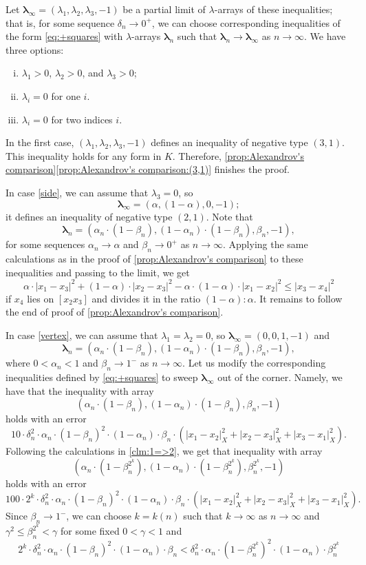 \documentclass[a4paper,10pt]{article}
\begin{document}
Let $\bm{\lambda}_\infty=(\lambda_1,\lambda_2,\lambda_3,-1)$ be a partial limit of $\lambda$-arrays of these inequalities;
that is, for some sequence $\delta_n\to 0^+$, we can choose corresponding inequalities of the form \ref{eq:+squares} with $\lambda$-arrays $\bm{\lambda}_n$ such that $\bm{\lambda}_n\to \bm{\lambda}_\infty$ as $n\to \infty$.
We have three options:
\begin{enumerate}[(i)]
\item\label{in} $\lambda_1>0$, $\lambda_2>0$, and $\lambda_3>0$;
\item\label{side} $\lambda_i=0$ for one $i$.
\item\label{vertex} $\lambda_i=0$ for two indices $i$.
\end{enumerate}

In the first case,  $(\lambda_1,\lambda_2,\lambda_3,-1)$ defines an inequality of negative type $(3,1)$.
This inequality holds for any form in $K$.
Therefore, \ref{prop:Alexandrov's comparison}\ref{prop:Alexandrov's comparison:(3,1)} finishes the proof.

In case \ref{side}, we can assume that $\lambda_3=0$, so
\[\bm{\lambda}_\infty=(\alpha,(1-\alpha),0,-1);\]
it defines an inequality of negative type $(2,1)$.
Note that
\[\bm{\lambda}_n=(\alpha_n\cdot(1-\beta_n),(1-\alpha_n)\cdot(1-\beta_n),\beta_n,-1),\]
for some sequences $\alpha_n\to\alpha$ and $\beta_n\to 0^+$ as $n\to\infty$.
Applying the same calculations as in the proof of \ref{prop:Alexandrov's comparison} to these inequalities and passing to the limit, we get
\[
\alpha\cdot|x_1-x_3|^2+(1-\alpha)\cdot|x_2-x_3|^2-\alpha\cdot (1-\alpha)\cdot|x_1-x_2|^2
\le
|x_3-x_4|^2
\]
if $x_4$ lies on $[x_2x_3]$ and divides it in the ratio $(1-\alpha):\alpha$.
It remains to follow the end of proof of \ref{prop:Alexandrov's comparison}.

In case \ref{vertex}, we can assume that $\lambda_1=\lambda_2=0$, so $\bm{\lambda}_\infty=(0,0,1,-1)$ and
\[\bm{\lambda}_n=(\alpha_n\cdot(1-\beta_n),(1-\alpha_n)\cdot(1-\beta_n),\beta_n,-1),\]
where $0<\alpha_n<1$ and $\beta_n\to 1^-$ as $n\to\infty$.
Let us modify the corresponding inequalities defined by \ref{eq:+squares} to sweep $\bm{\lambda}_\infty$ out of the corner.
Namely, we have that the inequality with array
\[(\alpha_n\cdot(1-\beta_n),(1-\alpha_n)\cdot(1-\beta_n),\beta_n,-1)\]
holds with an error
\[10\cdot\delta_n^2\cdot\alpha_n\cdot(1-\beta_n)^2\cdot(1-\alpha_n)\cdot\beta_n \cdot (|x_1-x_2|_X^2+|x_2-x_3|_X^2+|x_3-x_1|_X^2).\]
Following the calculations in \ref{clm:1=>2}, we get that inequality with array
\[(\alpha_n\cdot(1-\beta_n^{2^k}),(1-\alpha_n)\cdot(1-\beta_n^{2^k}),\beta_n^{2^k},-1)\]
holds with an error
\[100\cdot2^k\cdot\delta_n^2\cdot\alpha_n\cdot(1-\beta_n)^2\cdot(1-\alpha_n)\cdot\beta_n \cdot (|x_1-x_2|_X^2+|x_2-x_3|_X^2+|x_3-x_1|_X^2).\]
Since $\beta_n\to 1^-$, we can choose $k=k(n)$ such that $k\to \infty$ as $n\to \infty$ and $\gamma^2\le \beta_n^{2^k}<\gamma$ for some fixed $0<\gamma<1$ and
\[
2^k\cdot\delta_n^2\cdot \alpha_n\cdot(1-\beta_n)^2\cdot(1-\alpha_n)\cdot\beta_n
<
\delta_n^2\cdot \alpha_n\cdot(1-\beta_n^{2^k})^2\cdot(1-\alpha_n)\cdot\beta_n^{2^k}
\]
\end{document}
